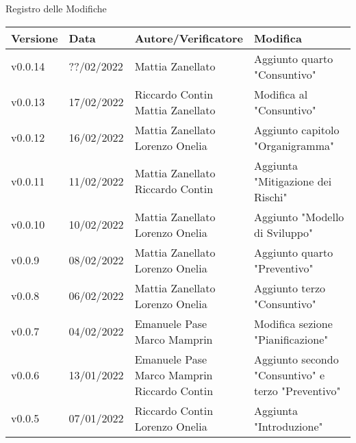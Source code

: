 \begin{center}
  \huge{Registro delle Modifiche}
\end{center}
\newcommand{\aCapo}[1]{%
  \begin{tabular}{@{}c@{}}\strut#1\strut\end{tabular}%
}
\begin{center}
  \begin{longtable}{|p{2cm}|p{2cm}|p{4cm}|p{5cm}|}
    \hline
    \textbf{Versione} & \textbf{Data} & \textbf{Autore/Verificatore} & \textbf{Modifica}     \\ \hline
    v0.0.14           & ??/02/2022    & \aCapo{Mattia Zanellato\\}             & Aggiunto quarto "Consuntivo" \\ \hline
    v0.0.13           & 17/02/2022    & \aCapo{Riccardo Contin\\Mattia Zanellato}             & Modifica al "Consuntivo" \\ \hline
    v0.0.12           & 16/02/2022    & \aCapo{Mattia Zanellato\\Lorenzo Onelia}              & Aggiunto capitolo "Organigramma" \\ \hline
    v0.0.11           & 11/02/2022    & \aCapo{Mattia Zanellato\\Riccardo Contin}             & Aggiunta "Mitigazione dei Rischi" \\ \hline
    v0.0.10           & 10/02/2022    & \aCapo{Mattia Zanellato\\Lorenzo Onelia}              & Aggiunto "Modello di Sviluppo" \\ \hline
    v0.0.9            & 08/02/2022    & \aCapo{Mattia Zanellato\\Lorenzo Onelia}              & Aggiunto quarto "Preventivo" \\ \hline
    v0.0.8            & 06/02/2022    & \aCapo{Mattia Zanellato\\Lorenzo Onelia}              & Aggiunto terzo "Consuntivo" \\ \hline
    v0.0.7            & 04/02/2022    & \aCapo{Emanuele Pase\\Marco Mamprin}                  & Modifica sezione "Pianificazione" \\ \hline
    v0.0.6            & 13/01/2022    & \aCapo{Emanuele Pase\\Marco Mamprin\\Riccardo Contin} & Aggiunto secondo "Consuntivo" e terzo "Preventivo" \\ \hline
    v0.0.5            & 07/01/2022    & \aCapo{Riccardo Contin\\Lorenzo Onelia}               & Aggiunta "Introduzione" \\ \hline

\end{longtable}
\end{center}
